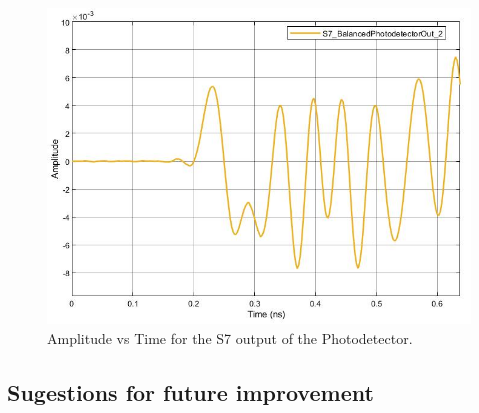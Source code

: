 \begin{figure}[h]
	\centering
	\includegraphics[width=\textwidth]{./lib/photodiode/figures/S7_BalancedPhotodetectorOut_2_time}
	\caption{Amplitude vs Time for the S7 output of the Photodetector.}
\end{figure}


\subsection*{Sugestions for future improvement}

